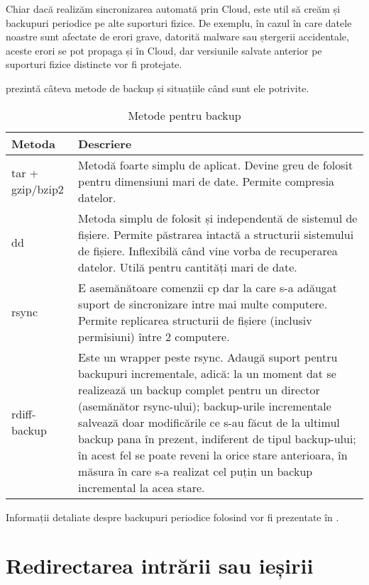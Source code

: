 Chiar dacă realizăm sincronizarea automată prin Cloud, este util să creăm și backupuri periodice pe alte suporturi fizice. De exemplu, în cazul în care datele noastre sunt afectate de erori grave, datorită malware sau ștergerii accidentale, aceste erori se pot propaga și în Cloud, dar versiunile salvate anterior pe suporturi fizice distincte vor fi protejate.

 prezintă câteva metode de backup și situațiile când sunt ele
potrivite.

\begin{table}[htb]
\begin{center}
  \begin{tabular}{ p{} p{} }
  \toprule
    \textbf{Metoda} & \textbf{Descriere} \\
  \midrule
    tar + gzip/bzip2 & Metodă foarte simplu de aplicat. Devine greu de folosit pentru dimensiuni mari de date. Permite compresia
    datelor. \\
  \midrule
    dd & Metoda simplu de folosit și independentă de sistemul de fișiere. Permite păstrarea intactă a structurii sistemului de fișiere. Inflexibilă când vine vorba de recuperarea datelor.  Utilă pentru cantități mari de date. \\
  \midrule
    rsync & E asemănătoare comenzii cp dar la care s-a adăugat suport de sincronizare intre mai multe computere. Permite replicarea structurii de fișiere (inclusiv permisiuni) între 2
    computere. \\
  \midrule
    rdiff-backup & Este un wrapper peste rsync. Adaugă suport pentru backupuri incrementale, adică: la un moment dat se realizează un backup complet pentru un director (asemănător rsync-ului); backup-urile incrementale salvează doar modificările ce s-au făcut de la ultimul backup pana în prezent, indiferent de tipul backup-ului; în acest fel se poate reveni la orice stare anterioara, în măsura în care s-a realizat cel puțin un backup incremental la acea stare. \\
  \bottomrule
  \end{tabular}
\end{center}
\caption{Metode pentru backup}
\label{table:file-system-backup-cmd}
\end{table}

Informații detaliate despre backupuri periodice folosind  vor fi prezentate în .

\section{Redirectarea intrării sau ieșirii}
\label{sec:fs:redirect}

